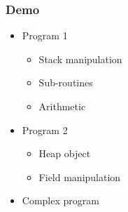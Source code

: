 \documentclass[handout]{beamer}
\begin{document}
\begin{frame}
  \frametitle{Demo}
  \begin{itemize}
  \item Program 1
    \begin{itemize}
    \item Stack manipulation
    \item Sub-routines
    \item Arithmetic
    \end{itemize}

  \item Program 2
    \begin{itemize}
    \item Heap object
    \item Field manipulation
    \end{itemize}

  \item Complex program
  \end{itemize}


\end{frame}
\end{document}
